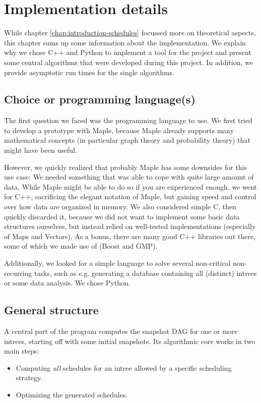 \chapter{Implementation details}
\label{sec:additional-algs}

While chapter \ref{chap:introduction-schedules} focussed more on theoretical aspects, this chapter sums up some information about the implementation. We explain why we chose C++ and Python to implement a tool for the project and present some central algorithms that were developed during this project. In addition, we provide asymptotic run times for the single algorithms.

\section{Choice or programming language(s)}
\label{sec:implementation-prog-lang}

The first question we faced was the programming language to use. We first tried to develop a prototype with Maple, because Maple already supports many mathematical concepts (in particular graph theory and probability theory) that might have been useful.

However, we quickly realized that probably Maple has some downsides for this use case: We needed something that was able to cope with quite large amount of data. While Maple might be able to do so if you are experienced enough, we went for C++, sacrificing the elegant notation of Maple, but gaining speed and control over how data are organized in memory. We also considered simple C, then quickly discarded it, because we did not want to implement some basic data structures ourselves, but instead relied on well-tested implementations (especially of Maps and Vectors). As a bonus, there are many good C++ libraries out there, some of which we made use of (Boost and GMP).

Additionally, we looked for a simple language to solve several non-critical non-recurring tasks, such as e.g. generating a database containing all (distinct) intrees or some data analysis. We chose Python.

\section{General structure}
\label{sec:implementation-general-structure}

A central part of the program computes the snapshot DAG for one or more intrees, starting off with some initial snapshots. Its algorithmic core works in two main steps: 
\begin{itemize}
\item Computing \emph{all} schedules for an intree allowed by a specific scheduling strategy.
\item Optimizing the generated schedules.
\end{itemize}


